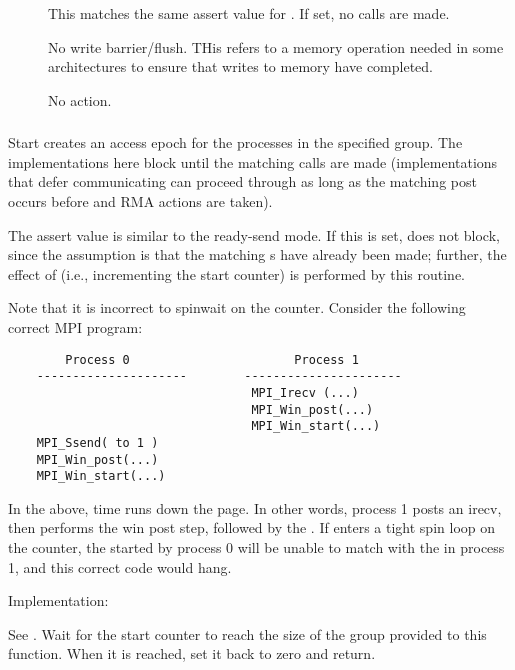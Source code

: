 \documentclass{article}
\begin{document}
\begin{description}
\item[]This matches the same assert value for
  .  If set, no  calls are made.
\item[]No write barrier/flush.  THis refers to a
  memory operation needed in some architectures to ensure that writes to
  memory have completed.
\item[]No action.
\end{description}

\subsubsection{}
Start creates an access epoch for the processes in the specified group.  The
implementations here block until the matching  calls are
made (implementations that defer communicating can proceed through
 as long as the matching post occurs before and RMA
actions are taken).

The  assert value is similar to the ready-send
mode.  If this is set,  does not block, since the
assumption is that the matching s have already been
made; further, the effect of  (i.e., incrementing the
start counter) is performed by this routine.

Note that it is incorrect to spinwait on the counter.  Consider the following
correct MPI program:
\begin{verbatim}
        Process 0                       Process 1
    ---------------------        ----------------------
                                  MPI_Irecv (...)
                                  MPI_Win_post(...)
                                  MPI_Win_start(...)
    MPI_Ssend( to 1 )
    MPI_Win_post(...)
    MPI_Win_start(...)
\end{verbatim}
In the above, time runs down the page.  In other words, process 1 posts an
irecv, then performs the win post step, followed by the
.  If  enters a tight spin loop
on the counter, the  started by process 0 will be unable to
match with the  in process 1, and this correct code would
hang.  

Implementation:

See .  Wait for the start counter to reach the size of
the group provided to this function.  When it is reached, set it back to zero
and return.  
\end{document}
